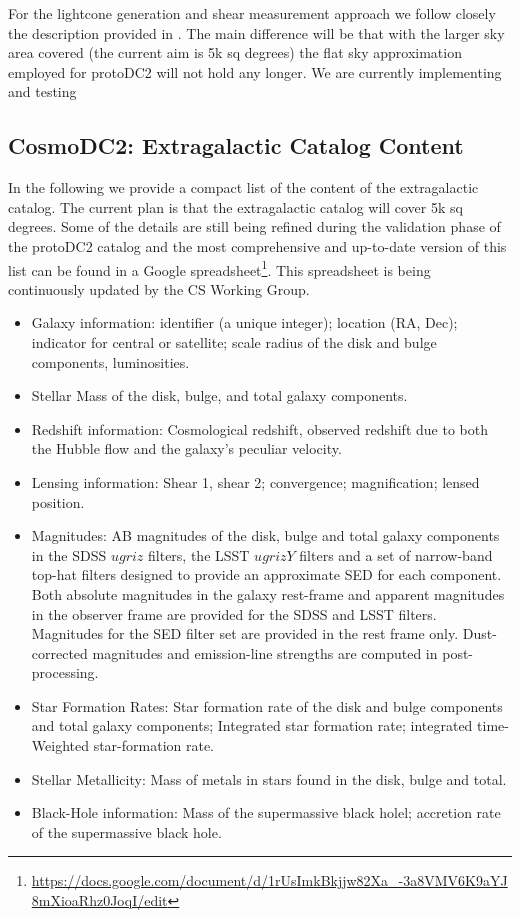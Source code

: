 \documentclass[preprint,times]{aastex61}
\begin{document}
For the lightcone generation and shear measurement approach we follow closely the description provided in \cite{protoDC2}. The main difference will be that with the larger sky area covered (the current aim is 5k sq degrees) the flat sky approximation employed for protoDC2 will not hold any longer. We are currently implementing and testing 

\subsection{CosmoDC2: Extragalactic Catalog Content}

In the following we provide a compact list of the content of the extragalactic catalog. The current plan is that the extragalactic catalog will cover 5k sq degrees. Some of the details are still being refined during the validation phase of the protoDC2 catalog and the most comprehensive and up-to-date version of this list can be found in a Google  spreadsheet\footnote{\url{https://docs.google.com/document/d/1rUsImkBkjjw82Xa_-3a8VMV6K9aYJ8mXioaRhz0JoqI/edit}}. This spreadsheet is being continuously updated by the CS Working Group. 


\begin{itemize}
\item Galaxy information: identifier (a unique integer); location (RA, Dec); indicator for central or satellite; scale radius of the disk and bulge components, luminosities.
\item    Stellar Mass of the disk, bulge, and total galaxy components.
\item Redshift information: Cosmological redshift, observed redshift due to both the Hubble flow and the galaxy's peculiar velocity.
\item Lensing information: Shear 1, shear 2; convergence; magnification; lensed position.
\item    Magnitudes: AB magnitudes of the disk, bulge and total galaxy components in the SDSS $ugriz$ filters, the LSST $ugrizY$ filters and a set of narrow-band top-hat filters designed to provide an approximate SED for each component.  Both absolute magnitudes in the galaxy rest-frame and apparent magnitudes in the observer frame are provided for the SDSS and LSST filters. Magnitudes for the SED filter set are provided in the rest frame only.
Dust-corrected magnitudes and emission-line strengths are computed in post-processing.
\item    Star Formation Rates: Star formation rate of the disk and bulge components and total galaxy components; 
Integrated star formation rate; integrated time-Weighted star-formation rate.
\item  Stellar Metallicity: Mass of metals in stars found in the disk, bulge and total. 
\item    Black-Hole information: Mass of the supermassive black holel; accretion rate of the supermassive black hole. 
\end{itemize}
 
\end{document}
